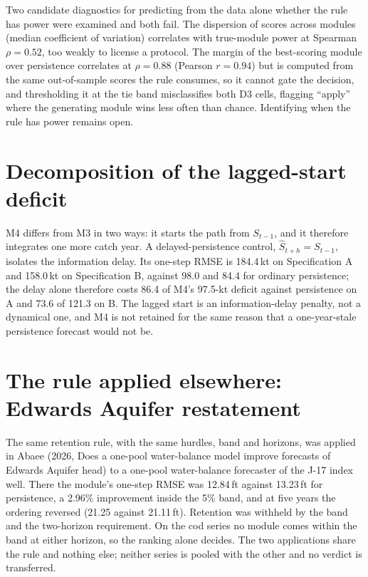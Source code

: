 \documentclass[preprint,11pt,authoryear]{elsarticle}
\theoremstyle{remark}
\begin{document}
Two candidate diagnostics for predicting from the data alone whether the rule has power were examined and both fail. The dispersion of scores across modules (median coefficient of variation) correlates with true-module power at Spearman $\rho = 0.52$, too weakly to license a protocol. The margin of the best-scoring module over persistence correlates at $\rho = 0.88$ (Pearson $r = 0.94$) but is computed from the same out-of-sample scores the rule consumes, so it cannot gate the decision, and thresholding it at the tie band misclassifies both D3 cells, flagging ``apply'' where the generating module wins less often than chance. Identifying when the rule has power remains open.

\FloatBarrier
\section{Decomposition of the lagged-start deficit}\label{si:m4}

M4 differs from M3 in two ways: it starts the path from $S_{t-1}$, and it therefore integrates one more catch year. A delayed-persistence control, $\hat S_{t+h} = S_{t-1}$, isolates the information delay. Its one-step RMSE is 184.4\,kt on Specification A and 158.0\,kt on Specification B, against 98.0 and 84.4 for ordinary persistence; the delay alone therefore costs 86.4 of M4's 97.5-kt deficit against persistence on A and 73.6 of 121.3 on B. The lagged start is an information-delay penalty, not a dynamical one, and M4 is not retained for the same reason that a one-year-stale persistence forecast would not be.

\FloatBarrier
\section{The rule applied elsewhere: Edwards Aquifer restatement}\label{si:edwards}

The same retention rule, with the same hurdles, band and horizons, was applied in Abaee (2026, Does a one-pool water-balance model improve forecasts of Edwards Aquifer head) to a one-pool water-balance forecaster of the J-17 index well. There the module's one-step RMSE was 12.84\,ft against 13.23\,ft for persistence, a 2.96\% improvement inside the 5\% band, and at five years the ordering reversed (21.25 against 21.11\,ft). Retention was withheld by the band and the two-horizon requirement. On the cod series no module comes within the band at either horizon, so the ranking alone decides. The two applications share the rule and nothing else; neither series is pooled with the other and no verdict is transferred.
\FloatBarrier
\end{document}
